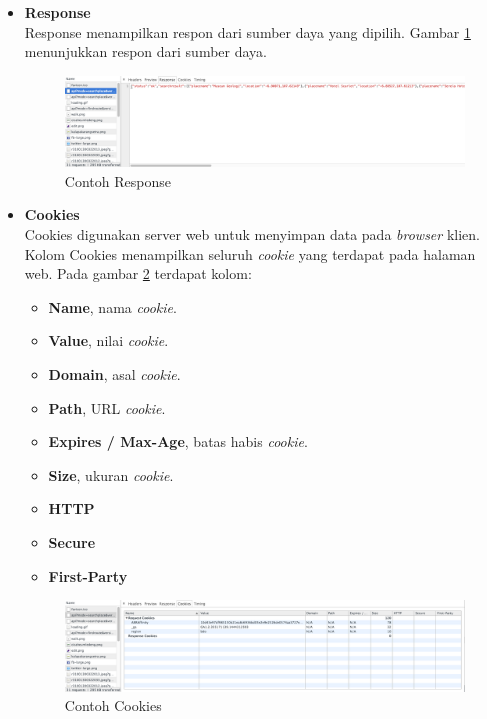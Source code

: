 \begin{itemize}
	\item \textbf{Response}\\
			Response menampilkan respon dari sumber daya yang dipilih. Gambar \ref{fig:2_devtools_network_response} menunjukkan respon dari sumber daya.
			
			\begin{figure}[H]
				\centering
				\includegraphics[scale=0.3]{Gambar/devtools-network-response}
				\caption{Contoh Response} 
				\label{fig:2_devtools_network_response}
			\end{figure}
			
	\item \textbf{Cookies}\\
			Cookies digunakan server web untuk menyimpan data pada \textit{browser} klien.  Kolom Cookies menampilkan seluruh \textit{cookie} yang terdapat pada halaman web. Pada gambar \ref{fig:2_devtools_network_cookies} terdapat kolom:
			\begin{itemize}
				\item \textbf{Name}, nama \textit{cookie}.
				\item \textbf{Value}, nilai \textit{cookie}.
				\item \textbf{Domain}, asal \textit{cookie}.
				\item \textbf{Path}, URL \textit{cookie}.
				\item \textbf{Expires / Max-Age}, batas habis \textit{cookie}.
				\item \textbf{Size}, ukuran \textit{cookie}.
				\item \textbf{HTTP}
				\item \textbf{Secure}
				\item \textbf{First-Party}
			\end{itemize}					 
			
			\begin{figure}[H]
				\centering
				\includegraphics[scale=0.3]{Gambar/devtools-network-cookies}
				\caption{Contoh Cookies} 
				\label{fig:2_devtools_network_cookies}
			\end{figure}
\end{itemize}

